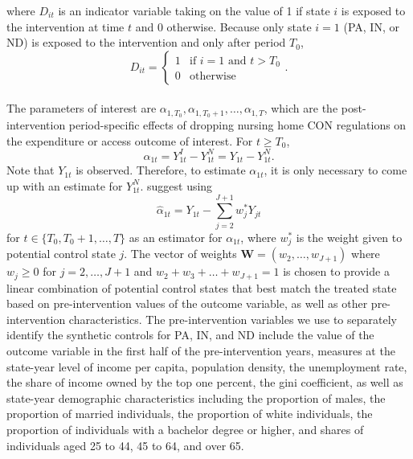 \documentclass[../Main.tex]{subfiles}
\begin{document}
where $D_{it}$ is an indicator variable taking on the value of 1 if state $i$ is exposed to the intervention at time $t$ and $0$ otherwise. Because only state $i = 1$ (PA, IN, or ND) is exposed to the intervention and only after period $T_0$, 
\begin{equation}
    D_{it}= 
\begin{cases}
    1 & \text{if } i=1 \text{ and } t>T_0\\
    0             & \text{otherwise}
\end{cases}.
\end{equation}\\
\indent The parameters of interest are $\alpha_{1,T_0},\alpha_{1,T_0+1},\dots,\alpha_{1,T}$, which are the post-intervention period-specific effects of dropping nursing home CON regulations on the expenditure or access outcome of interest. For $t\geq T_0$,
\begin{equation}
    \alpha_{1t}=Y_{1t}^I-Y_{1t}^N=Y_{1t}-Y_{1t}^N .
\end{equation}
Note that $Y_{1t}$ is observed. Therefore, to estimate $\alpha_{1t}$, it is only necessary to come up with an estimate for $Y_{1t}^N$. \citet{abadie2010synthetic} suggest using 
\begin{equation} \label{eq:year_spec_effect}
    \hat{\alpha}_{1t}=Y_{1t}-\sum_{j=2}^{J+1}w_j^*Y_{jt} 
\end{equation}
for $t\in\{T_0,T_0+1,\dots,T\}$ as an estimator for $\alpha_{1t}$, where $w_j^*$ is the weight given to potential control state $j$. The vector of weights $\mathbf{W} = (w_2,\dots,w_{J+1})$ where $w_j\geq 0$ for $j=2,\dots,J+1$ and $w_2+w_3+\dots+w_{J+1}=1$ is chosen to provide a linear combination of potential control states that best match the treated state based on pre-intervention values of the outcome variable, as well as other pre-intervention characteristics. The pre-intervention variables we use to separately identify the synthetic controls for PA, IN, and ND include the value of the outcome variable in the first half of the pre-intervention years, measures at the state-year level of income per capita, population density, the unemployment rate, the share of income owned by the top one percent, the gini coefficient, as well as state-year demographic characteristics including the proportion of males, the proportion of married individuals, the proportion of white individuals, the proportion of individuals with a bachelor degree or higher, and shares of individuals aged 25 to 44, 45 to 64, and over 65.\\
\end{document}
